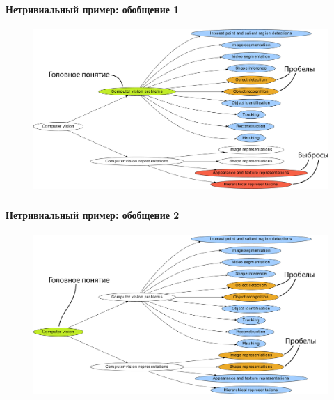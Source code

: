 \documentclass[aspectratio=169]{beamer}
\begin{document}
\begin{frame}
\frametitle{\insertsection}
\framesubtitle{Нетривиальный пример: обобщение 1}
\begin{figure}
	\centering
	\includegraphics[width=0.9\linewidth, clip]{images/lift_ex_nontriv_g1}
\end{figure}
\end{frame}
\begin{frame}
\frametitle{\insertsection}
\framesubtitle{Нетривиальный пример: обобщение 2}
\begin{figure}
\centering
\includegraphics[width=0.9\linewidth, clip]{images/lift_ex_nontriv_g2}
\end{figure}
\end{frame}
\end{document}

